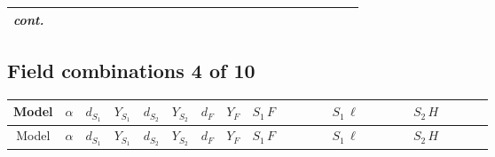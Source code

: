 \documentclass[8pt]{article}
\begin{document}
\begin{landscape}
\begin{longtable}{@{}cccccccc >{\raggedright\arraybackslash}p{0.21\linewidth} >{\raggedright\arraybackslash}p{0.21\linewidth} >{\raggedright\arraybackslash}p{0.21\linewidth}@{}}
\textit{cont.} &  &  &  &  &  &  &  &  &  & \scriptsize\adjustbox{max width=\linewidth}{$\begin{gathered} -\frac{2 \hbar  \overline{y_{2,i_1,r_1}} S_{1,j_3} S_{2,j_4} y_{2,i_1,r_1} S_{1,j_1}{}^{\dagger } S_{2,j_2}{}^{\dagger } \mathcal{I}_{12,j_3,j_1,j_4,j_2}{}^3 \lambda_{12}^{(1)}^{(3)}}{\sqrt{3} \epsilon } \\ -\frac{\hbar  \overline{y_{2,i_1,r_1}} S_{1,j_3} S_{2,j_4} y_{2,i_1,r_1} S_{1,j_1}{}^{\dagger } S_{2,j_2}{}^{\dagger } \mathcal{I}_{12,j_3,j_1,j_4,j_2}{}^3 \lambda_{12}^{(1)}^{(3)}}{\sqrt{3}}\end{gathered}$} \\
\midrule
\bottomrule
\end{longtable}
\clearpage
\subsection*{Field combinations 4 of 10}
\begin{longtable}{@{}cccccccc >{\raggedright\arraybackslash}p{0.21\linewidth} >{\raggedright\arraybackslash}p{0.21\linewidth} >{\raggedright\arraybackslash}p{0.21\linewidth}@{}}
\toprule
Model & $\alpha$ & $d_{S_1}$ & $Y_{S_1}$ & $d_{S_2}$ & $Y_{S_2}$ & $d_F$ & $Y_F$ & $S_1\,F$ & $S_1\,\ell$ & $S_2\,H$ \\
\midrule
\endfirsthead
\toprule
Model & $\alpha$ & $d_{S_1}$ & $Y_{S_1}$ & $d_{S_2}$ & $Y_{S_2}$ & $d_F$ & $Y_F$ & $S_1\,F$ & $S_1\,\ell$ & $S_2\,H$ \\
\midrule
\endhead

\end{longtable}
\end{landscape}
\end{document}
